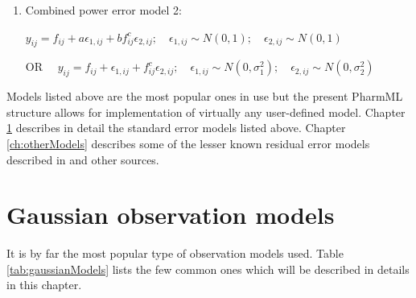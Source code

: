 \begin{enumerate}
\item
Combined power error model 2:
\begin{center}  $y_{ij} = f_{ij} + a\epsilon_{1,ij} + b f_{ij}^c \epsilon_{2,ij}; \quad \epsilon_{1,ij} \sim N(0,1); \quad \epsilon_{2,ij} \sim N(0,1)$ \end{center}
\begin{center} OR  $\quad y_{ij} = f_{ij} + \epsilon_{1,ij} + f_{ij}^c \epsilon_{2,ij}; \quad \epsilon_{1,ij} \sim N(0,\sigma_1^2); \quad \epsilon_{2,ij} \sim N(0,\sigma_2^2)$ \end{center}
\end{enumerate}

Models listed above are the most popular ones in use but the present 
PharmML structure allows for implementation of virtually any user-defined 
model. Chapter \ref{sec:typicalResModel} describes in detail the standard error 
models listed above. Chapter \ref{ch:otherModels} describes some of 
the lesser known residual error models described in \cite{Keizer:2013aa} and other sources.


\chapter{Gaussian observation models}
\label{sec:typicalResModel}

It is by far the most popular type of observation models used. Table \ref{tab:gaussianModels}  lists the 
few common ones which will be described in details in this chapter.

